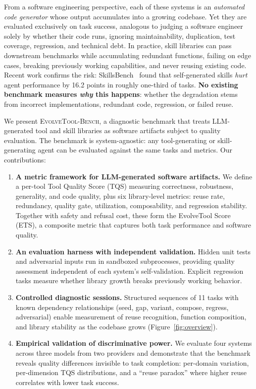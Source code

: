 \documentclass[sigplan,review,anonymous]{acmart}
\begin{document}
From a software engineering perspective, each of these systems is an \emph{automated code generator} whose output accumulates into a growing codebase. Yet they are evaluated exclusively on task success, analogous to judging a software engineer solely by whether their code runs, ignoring maintainability, duplication, test coverage, regression, and technical debt. In practice, skill libraries can pass downstream benchmarks while accumulating redundant functions, failing on edge cases, breaking previously working capabilities, and never reusing existing code. Recent work confirms the risk: SkillsBench~\cite{skillsbench2026} found that self-generated skills \emph{hurt} agent performance by 16.2 points in roughly one-third of tasks. \textbf{No existing benchmark measures \emph{why} this happens}: whether the degradation stems from incorrect implementations, redundant code, regression, or failed reuse.

We present \textsc{EvolveTool-Bench}, a diagnostic benchmark that treats LLM-generated tool and skill libraries as software artifacts subject to quality evaluation. The benchmark is system-agnostic: any tool-generating or skill-generating agent can be evaluated against the same tasks and metrics. Our contributions:

\begin{enumerate}
\item \textbf{A metric framework for LLM-generated software artifacts.} We define a per-tool Tool Quality Score (TQS) measuring correctness, robustness, generality, and code quality, plus six library-level metrics: reuse rate, redundancy, quality gate, utilization, composability, and regression stability. Together with safety and refusal cost, these form the EvolveTool Score (ETS), a composite metric that captures both task performance and software quality.

\item \textbf{An evaluation harness with independent validation.} Hidden unit tests and adversarial inputs run in sandboxed subprocesses, providing quality assessment independent of each system's self-validation. Explicit regression tasks measure whether library growth breaks previously working behavior.

\item \textbf{Controlled diagnostic sessions.} Structured sequences of 11 tasks with known dependency relationships (seed, gap, variant, compose, regress, adversarial) enable measurement of reuse recognition, function composition, and library stability as the codebase grows (Figure~\ref{fig:overview}).

\item \textbf{Empirical validation of discriminative power.} We evaluate four systems across three models from two providers and demonstrate that the benchmark reveals quality differences invisible to task completion: per-domain variation, per-dimension TQS distributions, and a ``reuse paradox'' where higher reuse correlates with lower task success.
\end{enumerate}
\end{document}
